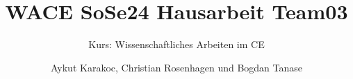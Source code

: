 \documentclass[
	ngerman,
	twoside,
	pdfa=false,
	ruledheaders=section,%
	class=report,%
	thesis={type=Hausarbeit},%
	accentcolor=2c,%
	custommargins=false,%
	marginpar=false,%
	parskip=half-,%
	fontsize=12pt,%
]{tudapub}
\begin{document}
	\title{WACE SoSe24 Hausarbeit Team03}
	\subtitle{Kurs: Wissenschaftliches Arbeiten im CE}
	\author[Karakoc, Rosenhagen, Tanase]{Aykut Karakoc, Christian Rosenhagen und Bogdan Tanase} %

	


	\maketitle


\end{document}
